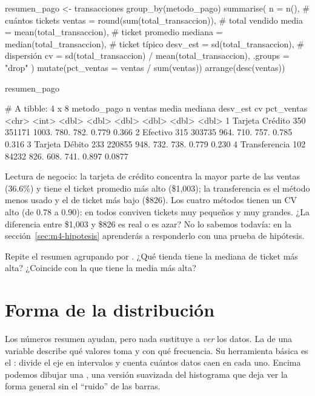 \begin{rcode}
resumen_pago <- transacciones %
  group_by(metodo_pago) %
  summarise(
    n        = n(),                                 # cuántos tickets
    ventas   = round(sum(total_transaccion)),       # total vendido
    media    = mean(total_transaccion),             # ticket promedio
    mediana  = median(total_transaccion),           # ticket típico
    desv_est = sd(total_transaccion),               # dispersión
    cv       = sd(total_transaccion) / mean(total_transaccion),
    .groups = "drop"
  ) %
  mutate(pct_ventas = ventas / sum(ventas)) %
  arrange(desc(ventas))

resumen_pago
\end{rcode}
\begin{rsalida}
# A tibble: 4 x 8
  metodo_pago         n ventas media mediana desv_est    cv pct_ventas
  <chr>           <int>  <dbl> <dbl>   <dbl>    <dbl> <dbl>      <dbl>
1 Tarjeta Crédito   350 351171 1003.    780.     782. 0.779     0.366
2 Efectivo          315 303735  964.    710.     757. 0.785     0.316
3 Tarjeta Débito    233 220855  948.    732.     738. 0.779     0.230
4 Transferencia     102  84232  826.    608.     741. 0.897     0.0877
\end{rsalida}

Lectura de negocio: la tarjeta de crédito concentra la mayor parte de las
ventas (36.6\%) y tiene el ticket promedio más alto (\$1,003); la
transferencia es el método menos usado y el de ticket más bajo (\$826). Los
cuatro métodos tienen un CV alto (de 0.78 a 0.90): en todos conviven tickets
muy pequeños y muy grandes. ¿La diferencia entre \$1,003 y \$826 es real o es azar? No lo
sabemos todavía: en la sección~\ref{sec:m4-hipotesis} aprenderás a
responderlo con una prueba de hipótesis.

\begin{hazlotu}
Repite el resumen agrupando por . ¿Qué tienda tiene la
mediana de ticket más alta? ¿Coincide con la que tiene la media más alta?
\end{hazlotu}

\section{Forma de la distribución}
\label{sec:m4-forma}

Los números resumen ayudan, pero nada sustituye a \emph{ver} los datos. La
 de una variable describe qué valores toma y con qué
frecuencia. Su herramienta básica es el : divide el eje en
intervalos y cuenta cuántos datos caen en cada uno. Encima podemos dibujar una
, una versión suavizada del histograma que deja
ver la forma general sin el ``ruido'' de las barras.

